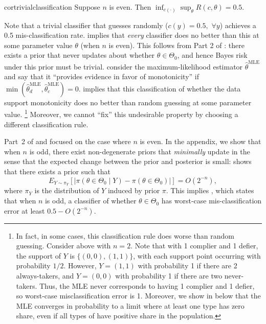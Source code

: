 \documentclass[12pt,reqno]{amsart}
\begin{document}
\begin{restatable}{cor}{trivialclassification}
 \label{cor:trivialclassification}
Suppose $n$ is even. Then $\inf_{c(\cdot)} \sup_{\theta} R(c,\theta) = 0.5$.         
\end{restatable}

\noindent Note that a trivial classifier that guesses randomly ($c(y) = 0.5,$ $\forall y$) achieves a 0.5 mis-classification rate.  implies that \emph{every} classifier does no better than this at some parameter value $\theta$ (when $n$ is even). This follows from Part 2 of : there exists a prior that never updates about whether $\theta \in \Theta_0$, and hence Bayes risk under this prior must be trivial. \citet{christy_counting_2025} consider the maximum-likelihood estimator $\hat\theta^{\text{MLE}}$ and say that it ``provides evidence in favor of monotonicity'' if $\min(\hat\theta^{\text{MLE}}_d, \hat\theta^{\text{MLE}}_c) = 0$.  implies that this classification of whether the data support monotonicity does no better than random guessing at some parameter value.%
\footnote{In fact, in some cases, this classification rule does worse than random guessing. Consider  above with $n=2$. Note that with 1 complier and 1 defier, the support of $Y$ is $\{(0,0),(1,1)\}$, with each support point occurring with probability $1/2$. However, $Y=(1,1)$ with probability 1 if there are 2 always-takers, and $Y=(0,0)$ with probability 1 if there are two never-takers. Thus, the MLE never corresponds to having 1 complier and 1 defier, so worst-case misclassification error is 1. Moreover, we show in  below that the MLE converges in probability to a limit where at least one type has zero share, even if all types of have positive share in the population.}
Moreover, we cannot ``fix'' this undesirable property by choosing a different classification rule.

Part~2 of  and  focused on the
case where $n$ is even. In the appendix, we show that when $n$ is odd, there exist
non-degenerate priors that \emph{minimally} update in the sense that the expected change
between the prior and posterior is small:  shows that there
exists a prior such that \[ E_{Y \sim \pi_Y}[ | \pi(\theta \in \Theta_0 \mid Y) -
\pi(\theta \in \Theta_0) |] = O(2^{-n}), \] where $\pi_Y$ is the distribution of $Y$
induced by prior $\pi$. This implies , which states that when
$n$ is odd, a classifier of whether $\theta \in \Theta_0$ has worst-case
mis-classification error at least $0.5 - O(2^{-n})$.
\end{document}
